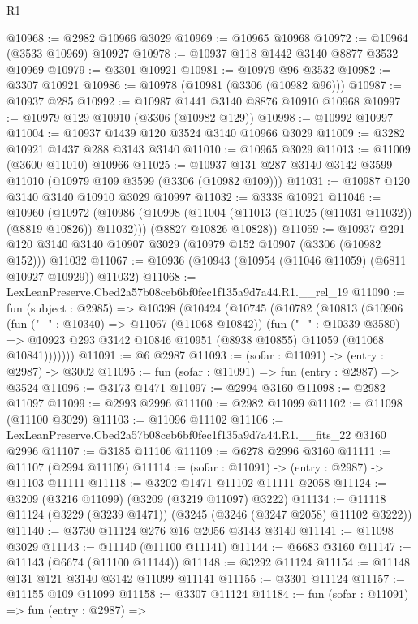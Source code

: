 \begin{lexlean}{R1}
\begin{coremodule}
@10968 := @2982 @10966 @3029
@10969 := @10965 @10968
@10972 := @10964 (@3533 @10969) @10927
@10978 := @10937 @118 @1442 @3140 @8877 @3532 @10969
@10979 := @3301 @10921
@10981 := @10979 @96 @3532
@10982 := @3307 @10921
@10986 := @10978 (@10981 (@3306 (@10982 @96)))
@10987 := @10937 @285
@10992 := @10987 @1441 @3140 @8876 @10910 @10968
@10997 := @10979 @129 @10910 (@3306 (@10982 @129))
@10998 := @10992 @10997
@11004 := @10937 @1439 @120 @3524 @3140 @10966 @3029
@11009 := @3282 @10921 @1437 @288 @3143 @3140
@11010 := @10965 @3029
@11013 := @11009 (@3600 @11010) @10966
@11025 := @10937 @131 @287 @3140 @3142 @3599 @11010 (@10979 @109 @3599 (@3306 (@10982 @109)))
@11031 := @10987 @120 @3140 @3140 @10910 @3029 @10997
@11032 := @3338 @10921
@11046 := @10960
    (@10972
      (@10986 (@10998 (@11004 (@11013 (@11025 (@11031 @11032)) (@8819 @10826)) @11032)))
      (@8827 @10826 @10828))
@11059 := @10937
    @291
    @120
    @3140
    @3140
    @10907
    @3029
    (@10979 @152 @10907 (@3306 (@10982 @152)))
    @11032
@11067 := @10936 (@10943 (@10954 (@11046 @11059) (@6811 @10927 @10929)) @11032)
@11068 := LexLeanPreserve.Cbed2a57b08ceb6bf0fec1f135a9d7a44.R1.__rel_19
@11090 := fun (subject : @2985) =>
  @10398
    (@10424
      (@10745
        (@10782
          (@10813
            (@10906
              (fun ("_" : @10340) => @11067 (@11068 @10842))
              (fun ("_" : @10339 @3580) =>
              @10923 @293 @3142 @10846 @10951 (@8938 @10855) @11059 (@11068 @10841)))))))
@11091 := @6 @2987
@11093 := (sofar : @11091) -> (entry : @2987) -> @3002
@11095 := fun (sofar : @11091) => fun (entry : @2987) => @3524
@11096 := @3173 @1471
@11097 := @2994 @3160
@11098 := @2982 @11097
@11099 := @2993 @2996
@11100 := @2982 @11099
@11102 := @11098 (@11100 @3029)
@11103 := @11096 @11102
@11106 := LexLeanPreserve.Cbed2a57b08ceb6bf0fec1f135a9d7a44.R1.__fits_22 @3160 @2996
@11107 := @3185 @11106
@11109 := @6278 @2996 @3160
@11111 := @11107 (@2994 @11109)
@11114 := (sofar : @11091) -> (entry : @2987) -> @11103 @11111
@11118 := @3202 @1471 @11102 @11111 @2058
@11124 := @3209 (@3216 @11099) (@3209 (@3219 @11097) @3222)
@11134 := @11118 @11124 (@3229 (@3239 @1471)) (@3245 (@3246 (@3247 @2058) @11102 @3222))
@11140 := @3730 @11124 @276 @16 @2056 @3143 @3140
@11141 := @11098 @3029
@11143 := @11140 (@11100 @11141)
@11144 := @6683 @3160
@11147 := @11143 (@6674 (@11100 @11144))
@11148 := @3292 @11124
@11154 := @11148 @131 @121 @3140 @3142 @11099 @11141
@11155 := @3301 @11124
@11157 := @11155 @109 @11099
@11158 := @3307 @11124
@11184 := fun (sofar : @11091) =>
  fun (entry : @2987) =>

\end{coremodule}
\end{lexlean}
